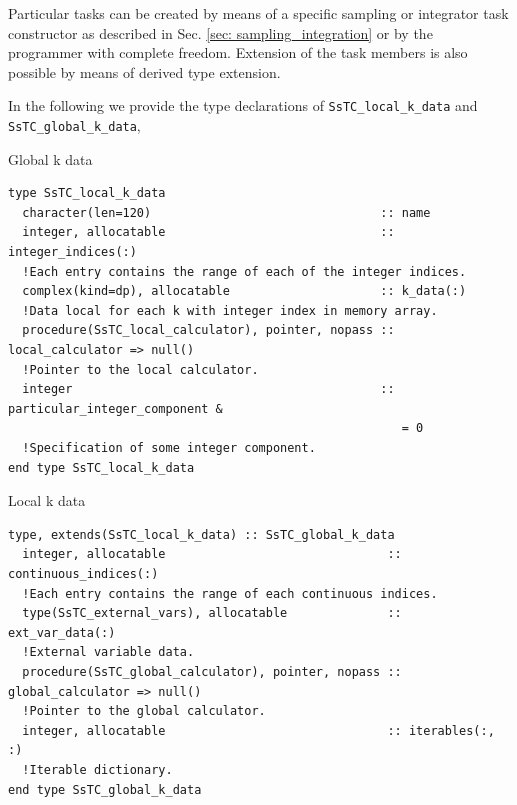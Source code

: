 \documentclass[10pt,a4paper]{article}
\begin{document}
Particular tasks can be created by means of a specific sampling or integrator task constructor as described in Sec. \ref{sec: sampling_integration} or by the programmer with complete freedom. Extension of the task members is also possible by means of derived type extension.

In the following we provide the type declarations of \verb|SsTC_local_k_data| and \verb|SsTC_global_k_data|,
\begin{codebox}{Global k data}
\begin{lstlisting}[caption={Derived type corresponding to ``local k data".},captionpos=b]
type SsTC_local_k_data
  character(len=120)                                :: name
  integer, allocatable                              :: integer_indices(:)
  !Each entry contains the range of each of the integer indices.
  complex(kind=dp), allocatable                     :: k_data(:)
  !Data local for each k with integer index in memory array.
  procedure(SsTC_local_calculator), pointer, nopass :: local_calculator => null()
  !Pointer to the local calculator.
  integer                                           :: particular_integer_component &
                                                       = 0
  !Specification of some integer component.
end type SsTC_local_k_data
\end{lstlisting}
\end{codebox}
\begin{codebox}{Local k data}
\begin{lstlisting}[caption={Derived type corresponding to ``global k data".},captionpos=b]
type, extends(SsTC_local_k_data) :: SsTC_global_k_data
  integer, allocatable                               :: continuous_indices(:)
  !Each entry contains the range of each continuous indices.
  type(SsTC_external_vars), allocatable              :: ext_var_data(:)
  !External variable data.
  procedure(SsTC_global_calculator), pointer, nopass :: global_calculator => null()
  !Pointer to the global calculator.
  integer, allocatable                               :: iterables(:, :)
  !Iterable dictionary.
end type SsTC_global_k_data
\end{lstlisting}
\end{codebox}
\end{document}
